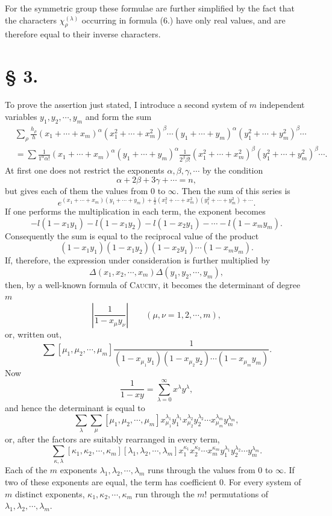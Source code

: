 \documentclass[11pt]{article}
\begin{document}
For the symmetric group these formulae are further simplified by the fact that the characters $\chi_\rho^{(\lambda)}$ occurring in formula (6.) have only real values, and are therefore equal to their inverse characters.

\section*{§ 3.}

To prove the assertion just stated, I introduce a second system of $m$ independent variables $y_1,y_2,\cdots,y_m$ and form the sum
\begin{equation}\tag{1.}
\begin{aligned}
 &\sum_\rho \frac{h_\rho}{h}(x_1+\cdots+x_m)^\alpha(x_1^2+\cdots+x_m^2)^\beta\cdots
 (y_1+\cdots+y_m)^\alpha(y_1^2+\cdots+y_m^2)^\beta\cdots\\
 &=\sum \frac{1}{1^\alpha\alpha!}(x_1+\cdots+x_m)^\alpha(y_1+\cdots+y_m)^\alpha
 \frac{1}{2^\beta\beta!}(x_1^2+\cdots+x_m^2)^\beta(y_1^2+\cdots+y_m^2)^\beta\cdots .
\end{aligned}
\end{equation}
At first one does not restrict the exponents $\alpha,\beta,\gamma,\cdots$ by the condition
\begin{equation}\tag{2.}
 \alpha+2\beta+3\gamma+\cdots=n,
\end{equation}
but gives each of them the values from $0$ to $\infty$. Then the sum of this series is
\[
 e^{(x_1+\cdots+x_m)(y_1+\cdots+y_m)+\frac12(x_1^2+\cdots+x_m^2)(y_1^2+\cdots+y_m^2)+\cdots}.
\]
If one performs the multiplication in each term, the exponent becomes
\[
 -l(1-x_1y_1)-l(1-x_1y_2)-l(1-x_2y_1)-\cdots-l(1-x_my_m).
\]
Consequently the sum is equal to the reciprocal value of the product
\[
 (1-x_1y_1)(1-x_1y_2)(1-x_2y_1)\cdots(1-x_my_m).
\]
If, therefore, the expression under consideration is further multiplied by
\[
 \Delta(x_1,x_2,\cdots,x_m)\Delta(y_1,y_2,\cdots,y_m),
\]
then, by a well-known formula of \textsc{Cauchy}, it becomes the determinant of degree $m$
\[
 \left|\frac{1}{1-x_\mu y_\nu}\right|\qquad(\mu,\nu=1,2,\cdots,m),
\]
or, written out,
\[
 \sum[\mu_1,\mu_2,\cdots,
\mu_m]\frac{1}{(1-x_{\mu_1}y_1)(1-x_{\mu_2}y_2)\cdots(1-x_{\mu_m}y_m)}.
\]
Now
\[
 \frac{1}{1-xy}=\sum_{\lambda=0}^\infty x^\lambda y^\lambda,
\]
and hence the determinant is equal to
\[
 \sum_\lambda\sum_\mu[\mu_1,\mu_2,\cdots,
\mu_m]x_{\mu_1}^{\lambda_1}y_1^{\lambda_1}x_{\mu_2}^{\lambda_2}y_2^{\lambda_2}\cdots x_{\mu_m}^{\lambda_m}y_m^{\lambda_m},
\]
or, after the factors are suitably rearranged in every term,
\begin{equation}\tag{3.}
 \sum_{\kappa,\lambda}[\kappa_1,\kappa_2,\cdots,
\kappa_m][\lambda_1,\lambda_2,\cdots,
\lambda_m]x_1^{\kappa_1}x_2^{\kappa_2}\cdots x_m^{\kappa_m}y_1^{\lambda_1}y_2^{\lambda_2}\cdots y_m^{\lambda_m}.
\end{equation}
Each of the $m$ exponents $\lambda_1,\lambda_2,\cdots,\lambda_m$ runs through the values from $0$ to $\infty$. If two of these exponents are equal, the term has coefficient $0$. For every system of $m$ distinct exponents, $\kappa_1,\kappa_2,\cdots,\kappa_m$ run through the $m!$ permutations of $\lambda_1,\lambda_2,\cdots,\lambda_m$.
\end{document}

